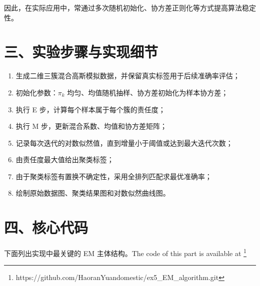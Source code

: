 \documentclass[12pt,a4paper]{ctexart}
\begin{document}
因此，在实际应用中，常通过多次随机初始化、协方差正则化等方式提高算法稳定性。

\section*{三、实验步骤与实现细节}
\begin{enumerate}
	\item 生成二维三簇混合高斯模拟数据，并保留真实标签用于后续准确率评估；
	\item 初始化参数：$\pi_k$ 均匀、均值随机抽样、协方差初始化为样本协方差；
	\item 执行 E 步，计算每个样本属于每个簇的责任度；
	\item 执行 M 步，更新混合系数、均值和协方差矩阵；
	\item 记录每次迭代的对数似然值，直到增量小于阈值或达到最大迭代次数；
	\item 由责任度最大值给出聚类标签；
	\item 由于聚类标签有置换不确定性，采用全排列匹配求最优准确率；
	\item 绘制原始数据图、聚类结果图和对数似然曲线图。
\end{enumerate}

\section*{四、核心代码}
下面列出实现中最关键的 EM 主体结构。The code of this part is available at \footnote{https://github.com/HaoranYuandomestic/ex5\_EM\_algorithm.git}
\end{document}
